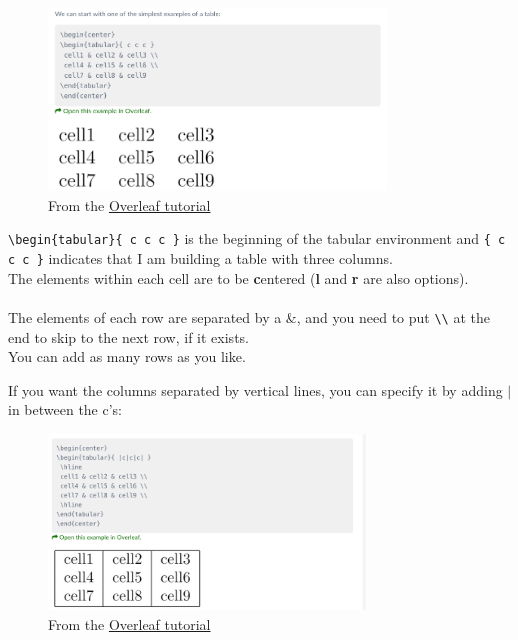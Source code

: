 \documentclass{article}
\begin{document}
\begin{figure}[H]
    \centering
    \includegraphics[width=0.8\textwidth]{table_simple.png}
    \caption{From the \href{https://www.overleaf.com/learn/latex/Tables}{Overleaf tutorial}}
    \label{fig:table_simple}
\end{figure}

\verb|\begin{tabular}{ c c c }| is the beginning of the tabular environment and \verb|{ c c c }| indicates that I am building a table with three columns.\\ 
The elements within each cell are to be \textbf{c}entered (\textbf{l} and \textbf{r} are also options).\\~\\
The elements of each row are separated by a \&, and you need to put \verb|\\| at the end to skip to the next row, if it exists.\\
You can add as many rows as you like.

If you want the columns separated by vertical lines, you can specify it by adding $\vert$ in between the c's:\\
\begin{figure}
    \centering
    \includegraphics[width=0.75\textwidth]{tab_vert_bar.png}
    \caption{From the \href{https://www.overleaf.com/learn/latex/Tables}{Overleaf tutorial}}
    \label{fig:table_vertical}
\end{figure}
\end{document}
